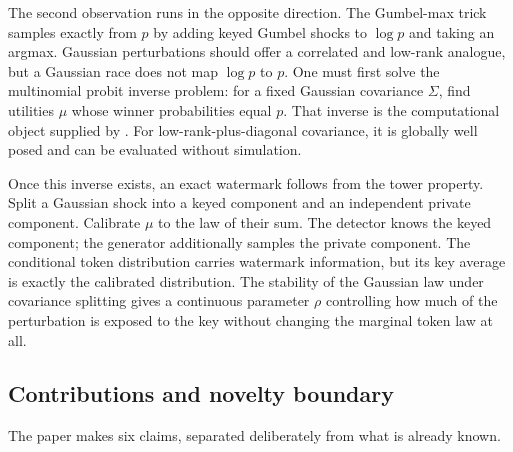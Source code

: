 \documentclass[11pt]{article}
\theoremstyle{definition}
\theoremstyle{remark}
\begin{document}
The second observation runs in the opposite direction. The Gumbel-max trick samples exactly from $p$ by adding keyed Gumbel shocks to $\log p$ and taking an argmax. Gaussian perturbations should offer a correlated and low-rank analogue, but a Gaussian race does not map $\log p$ to $p$. One must first solve the multinomial probit inverse problem: for a fixed Gaussian covariance $\Sigma$, find utilities $\mu$ whose winner probabilities equal $p$. That inverse is the computational object supplied by \citet{cotton2026calibration}. For low-rank-plus-diagonal covariance, it is globally well posed and can be evaluated without simulation.

Once this inverse exists, an exact watermark follows from the tower property. Split a Gaussian shock into a keyed component and an independent private component. Calibrate $\mu$ to the law of their sum. The detector knows the keyed component; the generator additionally samples the private component. The conditional token distribution carries watermark information, but its key average is exactly the calibrated distribution. The stability of the Gaussian law under covariance splitting gives a continuous parameter $\rho$ controlling how much of the perturbation is exposed to the key without changing the marginal token law at all.

\subsection{Contributions and novelty boundary}

The paper makes six claims, separated deliberately from what is already known.
\end{document}
